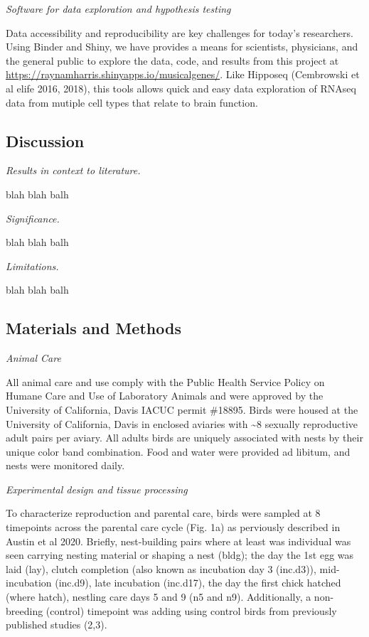 \emph{Software for data exploration and hypothesis testing}

Data accessibility and reproducibility are key challenges for today's
researchers. Using Binder and Shiny, we have provides a means for
scientists, physicians, and the general public to explore the data,
code, and results from this project at
\url{https://raynamharris.shinyapps.io/musicalgenes/}. Like Hipposeq
(Cembrowski et al elife 2016, 2018), this tools allows quick and easy
data exploration of RNAseq data from mutiple cell types that relate to
brain function.

\hypertarget{discussion}{%
\subsection{Discussion}\label{discussion}}

\emph{Results in context to literature. }

blah blah balh

\emph{Significance. }

blah blah balh

\emph{Limitations.}

blah blah balh

\hypertarget{materials-and-methods}{%
\subsection{Materials and Methods}\label{materials-and-methods}}

\emph{Animal Care}

All animal care and use comply with the Public Health Service Policy on
Humane Care and Use of Laboratory Animals and were approved by the
University of California, Davis IACUC permit \#18895. Birds were housed
at the University of California, Davis in enclosed aviaries with
\textasciitilde{}8 sexually reproductive adult pairs per aviary. All
adults birds are uniquely associated with nests by their unique color
band combination. Food and water were provided ad libitum, and nests
were monitored daily.

\emph{Experimental design and tissue processing}

To characterize reproduction and parental care, birds were sampled at 8
timepoints across the parental care cycle (Fig. 1a) as perviously
described in Austin et al 2020. Briefly, nest-building pairs where at
least was individual was seen carrying nesting material or shaping a
nest (bldg); the day the 1st egg was laid (lay), clutch completion (also
known as incubation day 3 (inc.d3)), mid-incubation (inc.d9), late
incubation (inc.d17), the day the first chick hatched (where hatch),
nestling care days 5 and 9 (n5 and n9). Additionally, a non-breeding
(control) timepoint was adding using control birds from previously
published studies (2,3).


